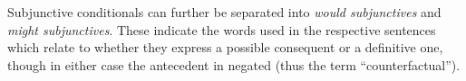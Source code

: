 \documentclass[12pt]{report}
\begin{document}
Subjunctive conditionals can further be separated into \emph{would subjunctives}
and \emph{might subjunctives}. These indicate the words used in the respective
sentences which relate to whether they express a possible consequent or a
definitive one, though in either case the antecedent in negated (thus the term
``counterfactual'').
\end{document}
